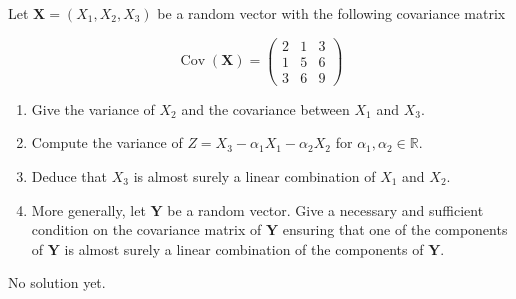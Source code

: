 \begin{Exercise}
  Let $\mathbf{X}=\left(X_{1}, X_{2}, X_{3}\right)$ be a random vector with the following covariance matrix

  \[
    \operatorname{Cov}(\mathbf{X})=\left(\begin{array}{lll}
        2 & 1 & 3 \\
        1 & 5 & 6 \\
        3 & 6 & 9
      \end{array}\right)
  \]

  \begin{enumerate}
    \item Give the variance of $X_{2}$ and the covariance between $X_{1}$ and $X_{3}$.

    \item Compute the variance of $Z=X_{3}-\alpha_{1} X_{1}-\alpha_{2} X_{2}$ for
          $\alpha_{1}, \alpha_{2} \in \mathbb{R}$.

    \item Deduce that $X_{3}$ is almost surely a linear combination of $X_{1}$ and
          $X_{2}$.

    \item More generally, let $\mathbf{Y}$ be a random vector. Give a necessary and
          sufficient condition on the covariance matrix of $\mathbf{Y}$ ensuring that one
          of the components of $\mathbf{Y}$ is almost surely a linear combination of the
          components of $\mathbf{Y}$.

  \end{enumerate}

\end{Exercise}


\begin{solution}
  No solution yet.
\end{solution}